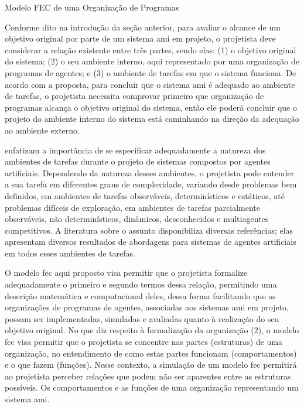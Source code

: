 \begin{section}{Modelo FEC de uma Organização de Programas}
\label{subsec:desc-fec}

    Conforme dito na introdução da seção anterior, para avaliar o alcance de um objetivo original por parte de um sistema \acrshort{ami} em projeto, o projetista deve considerar a relação existente entre três partes, sendo elas: (1) o objetivo original do sistema; (2) o seu ambiente interno, aqui representado por uma organização de programas de agentes; e (3) o ambiente de tarefas em que o sistema funciona. De acordo com a proposta, para concluir que o sistema \acrshort{ami} é adequado ao ambiente de tarefas, o projetista necessita comprovar primeiro que organização de programas alcança o objetivo original do sistema, então ele poderá concluir que o projeto do ambiente interno do sistema está caminhando na direção da adequação ao ambiente externo. 

     enfatizam a importância de se especificar adequadamente a natureza dos ambientes de tarefas durante o projeto de sistemas compostos por agentes artificiais. Dependendo da natureza desses ambientes, o projetista pode entender a sua tarefa em diferentes graus de complexidade, variando desde problemas bem definidos, em ambientes de tarefas observáveis, determinísticos e estáticos, até problemas difíceis de exploração, em ambientes de tarefas parcialmente observáveis, não determinísticos, dinâmicos, desconhecidos e multiagentes competitivos. A literatura sobre o assunto disponibiliza diversas referências; elas apresentam diversos resultados de abordagens para sistemas de agentes artificiais em todos esses ambientes de tarefas.

    O modelo \acrshort{fec} aqui proposto visa permitir que o projetista formalize adequadamente o primeiro e segundo termos dessa relação, permitindo uma descrição matemática e computacional deles, dessa forma facilitando que as organizações de programas de agentes, associadas aos sistemas \acrshort{ami} em projeto, possam ser implementadas, simuladas e avaliadas quanto à realização do seu objetivo original. No que diz respeito à formalização da organização (2), o modelo \acrshort{fec} visa permitir que o projetista se concentre nas partes (estruturas) de uma organização, no entendimento de como estas partes funcionam (comportamentos) e o que fazem (funções). Nesse contexto, a simulação de um modelo \acrshort{fec} permitirá ao projetista perceber relações que podem não ser aparentes entre as estruturas possíveis. Os comportamentos e as funções de uma organização representando um sistema \acrshort{ami}.
    

\end{section}
